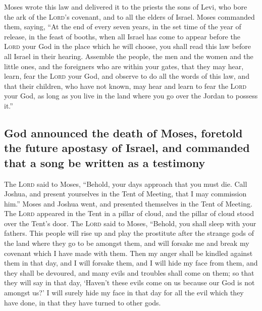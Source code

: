  Moses wrote this law and delivered it to the priests the
sons of Levi, who bore the ark of the \textsc{Lord}'s covenant, and to
all the elders of Israel.  Moses commanded them, saying,
``At the end of every seven years, in the set time of the year of
release, in the feast of booths,  when all Israel has
come to appear before the \textsc{Lord} your God in the place which he
will choose, you shall read this law before all Israel in their hearing.
 Assemble the people, the men and the women and the
little ones, and the foreigners who are within your gates, that they may
hear, learn, fear the \textsc{Lord} your God, and observe to do all the
words of this law,  and that their children, who have not
known, may hear and learn to fear the \textsc{Lord} your God, as long as
you live in the land where you go over the Jordan to possess it.''

\hypertarget{god-announced-the-death-of-moses-foretold-the-future-apostasy-of-israel-and-commanded-that-a-song-be-written-as-a-testimony}{%
\subsection{God announced the death of Moses, foretold the future
apostasy of Israel, and commanded that a song be written as a
testimony}\label{god-announced-the-death-of-moses-foretold-the-future-apostasy-of-israel-and-commanded-that-a-song-be-written-as-a-testimony}}

 The \textsc{Lord} said to Moses, ``Behold, your days
approach that you must die. Call Joshua, and present yourselves in the
Tent of Meeting, that I may commission him.'' Moses and Joshua went, and
presented themselves in the Tent of Meeting.  The
\textsc{Lord} appeared in the Tent in a pillar of cloud, and the pillar
of cloud stood over the Tent's door.  The \textsc{Lord}
said to Moses, ``Behold, you shall sleep with your fathers. This people
will rise up and play the prostitute after the strange gods of the land
where they go to be amongst them, and will forsake me and break my
covenant which I have made with them.  Then my anger
shall be kindled against them in that day, and I will forsake them, and
I will hide my face from them, and they shall be devoured, and many
evils and troubles shall come on them; so that they will say in that
day, `Haven't these evils come on us because our God is not amongst us?'
 I will surely hide my face in that day for all the evil
which they have done, in that they have turned to other gods.

